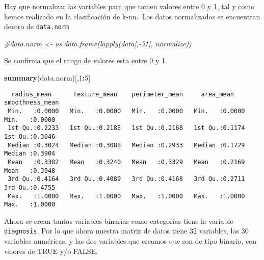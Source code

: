 \documentclass[
]{article}
\newenvironment{Shaded}{\begin{snugshade}}{\end{snugshade}}
\newcommand{\CommentTok}[1]{\textcolor[rgb]{0.56,0.35,0.01}{\textit{#1}}}
\newcommand{\DecValTok}[1]{\textcolor[rgb]{0.00,0.00,0.81}{#1}}
\newcommand{\KeywordTok}[1]{\textcolor[rgb]{0.13,0.29,0.53}{\textbf{#1}}}
\newcommand{\NormalTok}[1]{#1}
\newcommand{\OperatorTok}[1]{\textcolor[rgb]{0.81,0.36,0.00}{\textbf{#1}}}
\newcommand{\StringTok}[1]{\textcolor[rgb]{0.31,0.60,0.02}{#1}}
\begin{document}
Hay que normalizar las variables para que tomen valores entre 0 y 1, tal
y como hemos realizado en la clasificación de k-nn.~Los datos
normalizados se encuentran dentro de \texttt{data.norm}

\begin{Shaded}
\begin{Highlighting}[]
\CommentTok{#data.norm <- as.data.frame(lapply(data[,-31], normalize))}
\end{Highlighting}
\end{Shaded}

Se confirma que el rango de valores esta entre 0 y 1.

\begin{Shaded}
\begin{Highlighting}[]
\KeywordTok{summary}\NormalTok{(data.norm)[,}\DecValTok{1}\OperatorTok{:}\DecValTok{5}\NormalTok{]}
\end{Highlighting}
\end{Shaded}

\begin{verbatim}
  radius_mean      texture_mean    perimeter_mean     area_mean      smoothness_mean 
 Min.   :0.0000   Min.   :0.0000   Min.   :0.0000   Min.   :0.0000   Min.   :0.0000  
 1st Qu.:0.2233   1st Qu.:0.2185   1st Qu.:0.2168   1st Qu.:0.1174   1st Qu.:0.3046  
 Median :0.3024   Median :0.3088   Median :0.2933   Median :0.1729   Median :0.3904  
 Mean   :0.3382   Mean   :0.3240   Mean   :0.3329   Mean   :0.2169   Mean   :0.3948  
 3rd Qu.:0.4164   3rd Qu.:0.4089   3rd Qu.:0.4168   3rd Qu.:0.2711   3rd Qu.:0.4755  
 Max.   :1.0000   Max.   :1.0000   Max.   :1.0000   Max.   :1.0000   Max.   :1.0000  
\end{verbatim}

Ahora se crean tantas variables binarias como categorias tiene la
variable \texttt{diagnosis}. Por lo que ahora nuestra matriz de datos
tiene 32 variables, las 30 variables numéricas, y las dos variables que
creamos que son de tipo binario, con valores de TRUE y/o FALSE.

\begin{Shaded}
\end{Shaded}
\end{document}
